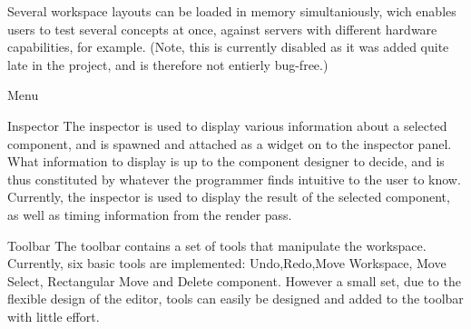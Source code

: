 Several workspace layouts can be loaded in memory simultaniously, wich enables users to test several concepts at once, against servers with different hardware capabilities, for example. (Note, this is currently disabled as it was added quite late in the project, and is therefore not entierly bug-free.)

Menu

Inspector
The inspector is used to display various information about a selected component, and is spawned and attached as a widget on to the inspector panel. What information to display is up to the component designer to decide, and is thus constituted by whatever the programmer finds intuitive to the user to know. Currently, the inspector is used to display the result of the selected component, as well as timing information from the render pass.

Toolbar
The toolbar contains a set of tools that manipulate the workspace. Currently, six basic tools are implemented: Undo,Redo,Move Workspace, Move Select, Rectangular Move and Delete component. However a small set, due to the flexible design of the editor, tools can easily be designed and added to the toolbar with little effort. 
 